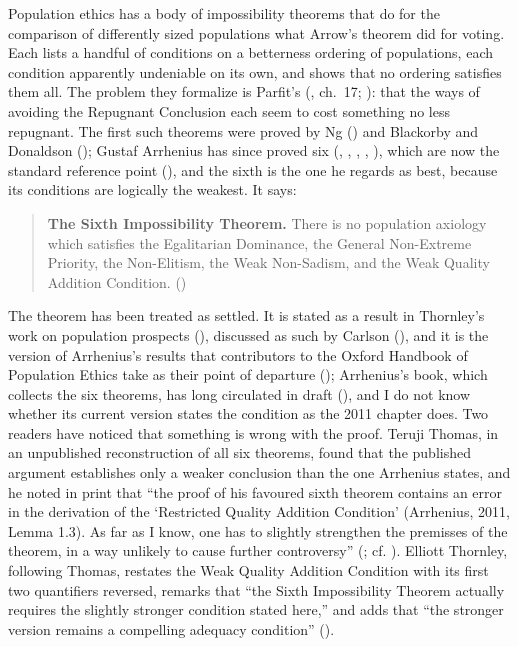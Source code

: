 \documentclass[
  11pt,
  letterpaper,
  DIV=11,
  numbers=noendperiod,
  twoside]{scrartcl}
\begin{document}
Population ethics has a body of impossibility theorems that do for the
comparison of differently sized populations what Arrow's theorem did for
voting. Each lists a handful of conditions on a betterness ordering of
populations, each condition apparently undeniable on its own, and shows
that no ordering satisfies them all. The problem they formalize is
Parfit's (, ch.~17;
): that the ways of avoiding the
Repugnant Conclusion each seem to cost something no less repugnant. The
first such theorems were proved by Ng () and
Blackorby and Donaldson ();
Gustaf Arrhenius has since proved six
(,
,
, ,
), which are now the standard
reference point (), and the
sixth is the one he regards as best, because its conditions are
logically the weakest. It says:

\begin{quote}
\textbf{The Sixth Impossibility Theorem.} There is no population
axiology which satisfies the Egalitarian Dominance, the General
Non-Extreme Priority, the Non-Elitism, the Weak Non-Sadism, and the Weak
Quality Addition Condition. ()
\end{quote}

The theorem has been treated as settled. It is stated as a result in
Thornley's work on population prospects
(), discussed as such by
Carlson (), and it is the version of
Arrhenius's results that contributors to the Oxford Handbook of
Population Ethics take as their point of departure
(); Arrhenius's
book, which collects the six theorems, has long circulated in draft
(), and I do
not know whether its current version states the condition as the 2011
chapter does. Two readers have noticed that something is wrong with the
proof. Teruji Thomas, in an unpublished reconstruction of all six
theorems, found that the published argument establishes only a weaker
conclusion than the one Arrhenius states, and he noted in print that
``the proof of his favoured sixth theorem contains an error in the
derivation of the `Restricted Quality Addition Condition' (Arrhenius,
2011, Lemma 1.3). As far as I know, one has to slightly strengthen the
premisses of the theorem, in a way unlikely to cause further
controversy'' (; cf.
). Elliott Thornley, following
Thomas, restates the Weak Quality Addition Condition with its first two
quantifiers reversed, remarks that ``the Sixth Impossibility Theorem
actually requires the slightly stronger condition stated here,'' and
adds that ``the stronger version remains a compelling adequacy
condition'' ().
\end{document}
